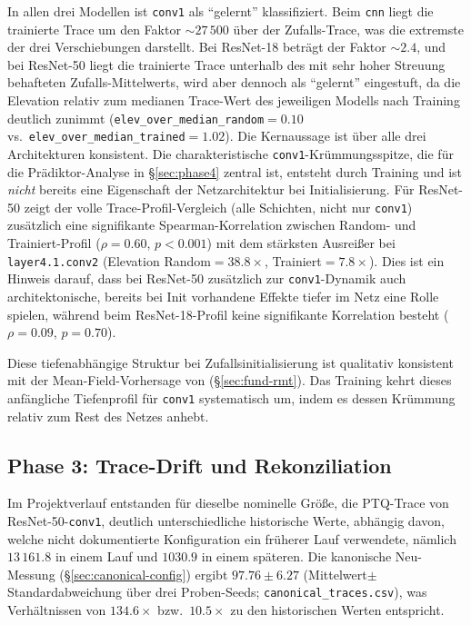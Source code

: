 In allen drei Modellen ist \texttt{conv1} als \enquote{gelernt} klassifiziert. Beim \texttt{cnn} liegt die trainierte Trace um den Faktor $\sim\!27\,500$ über der Zufalls-Trace, was die extremste der drei Verschiebungen darstellt. Bei ResNet-18 beträgt der Faktor $\sim\!2.4$, und bei ResNet-50 liegt die trainierte Trace unterhalb des mit sehr hoher Streuung behafteten Zufalls-Mittelwerts, wird aber dennoch als \enquote{gelernt} eingestuft, da die Elevation relativ zum medianen Trace-Wert des jeweiligen Modells nach Training deutlich zunimmt (\texttt{elev\_over\_median\_random}$=0.10$ vs.\ \texttt{elev\_over\_median\_trained}$=1.02$). Die Kernaussage ist über alle drei Architekturen konsistent. Die charakteristische \texttt{conv1}-Krümmungsspitze, die für die Prädiktor-Analyse in \S\ref{sec:phase4} zentral ist, entsteht durch Training und ist \emph{nicht} bereits eine Eigenschaft der Netzarchitektur bei Initialisierung. Für ResNet-50 zeigt der volle Trace-Profil-Vergleich (alle Schichten, nicht nur \texttt{conv1}) zusätzlich eine signifikante Spearman-Korrelation zwischen Random- und Trainiert-Profil ($\rho=0.60$, $p<0.001$) mit dem stärksten Ausreißer bei \texttt{layer4.1.conv2} (Elevation Random$=38.8\times$, Trainiert$=7.8\times$). Dies ist ein Hinweis darauf, dass bei ResNet-50 zusätzlich zur \texttt{conv1}-Dynamik auch architektonische, bereits bei Init vorhandene Effekte tiefer im Netz eine Rolle spielen, während beim ResNet-18-Profil keine signifikante Korrelation besteht ($\rho=0.09$, $p=0.70$).
\par\medskip

Diese tiefenabhängige Struktur bei Zufallsinitialisierung ist qualitativ konsistent mit der Mean-Field-Vorhersage von \citet{karakida_fisher_2019} (\S\ref{sec:fund-rmt}). Das Training kehrt dieses anfängliche Tiefenprofil für \texttt{conv1} systematisch um, indem es dessen Krümmung relativ zum Rest des Netzes anhebt.

\subsection{Phase 3: Trace-Drift und Rekonziliation}
\label{sec:phase3}

Im Projektverlauf entstanden für dieselbe nominelle Größe, die PTQ-Trace von ResNet-50-\texttt{conv1}, deutlich unterschiedliche historische Werte, abhängig davon, welche nicht dokumentierte Konfiguration ein früherer Lauf verwendete, nämlich $13\,161.8$ in einem Lauf und $1030.9$ in einem späteren. Die kanonische Neu-Messung (\S\ref{sec:canonical-config}) ergibt $97.76 \pm 6.27$ (Mittelwert$\pm$Standardabweichung über drei Proben-Seeds; \texttt{canonical\_traces.csv}), was Verhältnissen von $134.6\times$ bzw.\ $10.5\times$ zu den historischen Werten entspricht.

